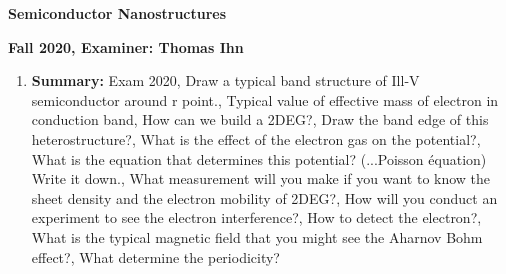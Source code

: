 \documentclass{article}%
\begin{document}
%
\normalsize%
\begin{center}%
\begin{Large}%
\textbf{Semiconductor Nanostructures}%
\end{Large}%
\linebreak%
\end{center}%
\begin{center}%
\begin{large}%
\textbf{Fall 2020, Examiner: Thomas Ihn}%
\end{large}%
\end{center}%
\begin{enumerate}%
\item%
\begin{mycolorbox}%
\textbf{Summary:}%
\newline%
Exam 2020, Draw a typical band structure of Ill{-}V semiconductor around r point., Typical value of effective mass of electron in conduction band, How can we build a 2DEG?, Draw the band edge of this heterostructure?, What is the effect of the electron gas on the potential?, What is the equation that determines this potential? (...Poisson équation) Write it down., What measurement will you make if you want to know the sheet density and the electron mobility of 2DEG?, How will you conduct an experiment to see the electron interference?, How to detect the electron?, What is the typical magnetic field that you might see the Aharnov Bohm effect?, What determine the periodicity?%
\end{mycolorbox}%
\end{enumerate}%
\newpage%
\end{document}
